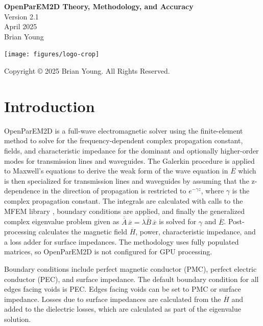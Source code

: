 \documentclass[titlepage]{article}
\renewcommand\_{\textunderscore\linebreak[1]}
\begin{document}
\begin{titlepage}

   \centering
   \vspace*{3cm}
   {\huge\bfseries OpenParEM2D Theory, Methodology, and Accuracy} \\
   \vskip1cm
   {\Large Version 2.1} \\
   \vskip1cm
   {\Large April 2025} \\
   \vskip1cm
   {\Large Brian Young} \\

   \vfill

   \texttt{[image: figures/logo-crop]}

   \vspace*{\fill}
   Copyright \copyright{} 2025 Brian Young. All Rights Reserved.
\end{titlepage}

\tableofcontents

\newpage
\section{Introduction}

OpenParEM2D is a full-wave electromagnetic solver using the finite-element method to solve for the frequency-dependent complex propagation constant, fields, and characteristic impedance for the dominant and optionally higher-order modes for transmission lines and waveguides.  The Galerkin procedure is applied to Maxwell's equations to derive the weak form of the wave equation in $\overline{E}$ which is then specialized for transmission lines and waveguides by assuming that the z-dependence in the direction of propagation is restricted to $e^{-\gamma z}$, where $\gamma$ is the complex propagation constant.  The integrals are calculated with calls to the MFEM library \cite{MFEM}\cite{MFEMweb}, boundary conditions are applied, and finally the generalized complex eigenvalue problem given as $\overline{\overline{A}}\,\overline{x}=\lambda\overline{\overline{B}}\,\overline{x}$ is solved for $\gamma$ and $\overline{E}$.  Post-processing calculates the magnetic field $\overline{H}$, power, characteristic impedance, and a loss adder for surface impedances.  The methodology uses fully populated matrices, so OpenParEM2D is not configured for GPU processing.

Boundary conditions include perfect magnetic conductor (PMC), perfect electric conductor (PEC), and surface impedance.  The default boundary condition for all edges facing voids is PEC.  Edges facing voids can be set to PMC or surface impedance.  Losses due to surface impedances are calculated from the $\overline{H}$ and added to the dielectric losses, which are calculated as part of the eigenvalue solution.
\end{document}
